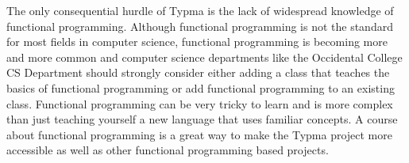 \documentclass[10pt,twocolumn]{article}
\begin{document}
The only consequential hurdle of Typma is the lack of widespread knowledge of functional programming. Although functional programming is not the standard for most fields in computer science, functional programming is becoming more and more common and computer science departments like the Occidental College CS Department should strongly consider either adding a class that teaches the basics of functional programming or add functional programming to an existing class. Functional programming can be very tricky to learn and is more complex than just teaching yourself a new language that uses familiar concepts. A course about functional programming is a great way to make the Typma project more accessible as well as other functional programming based projects.

\printbibliography 
\end{document}
